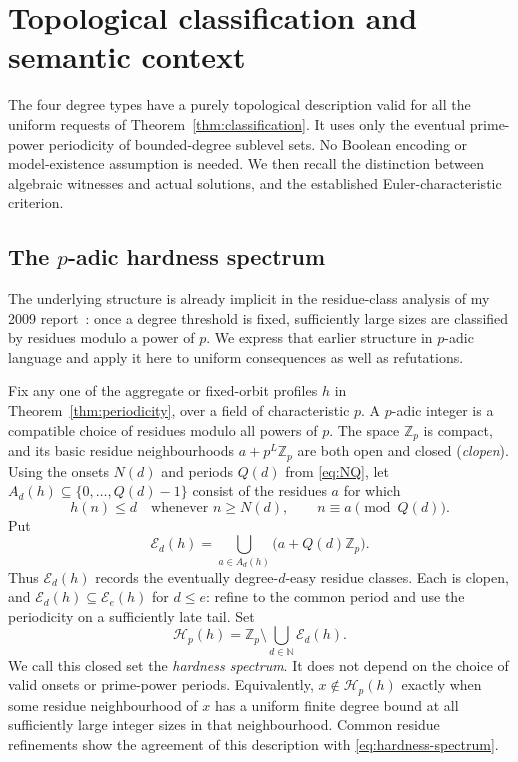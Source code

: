 \section{Topological classification and semantic context}
\label{sec:model-theory}
The four degree types have a purely topological description valid for
all the uniform requests of Theorem~\ref{thm:classification}. It uses
only the eventual prime-power periodicity of bounded-degree
sublevel sets. No Boolean encoding or model-existence assumption is
needed. We then recall the distinction between algebraic witnesses
and actual solutions, and the established Euler-characteristic criterion.

\subsection{The \texorpdfstring{$p$}{p}-adic hardness spectrum}
\label{sec:topological-spectrum}
The underlying structure is already implicit in the residue-class
analysis of my 2009 report~\cite[Section~4, pp.~18--19]{RiisLong}:
once a degree threshold is fixed, sufficiently large sizes are classified
by residues modulo a power of $p$. We express that earlier structure
in $p$-adic language and apply it here to uniform consequences as well
as refutations.

Fix any one of the aggregate or fixed-orbit profiles $h$ in
Theorem~\ref{thm:periodicity}, over a field of characteristic $p$.
A $p$-adic integer is a compatible choice of residues modulo all powers
of $p$. The space $\mathbb Z_p$ is compact, and its basic residue
neighbourhoods $a+p^L\mathbb Z_p$ are both open and closed
(\emph{clopen}). Using the onsets $N(d)$ and periods $Q(d)$ from
\eqref{eq:NQ}, let $A_d(h)\subseteq\{0,\ldots,Q(d)-1\}$ consist of
the residues $a$ for which
\[
 h(n)\le d\quad\text{whenever }n\ge N(d),\qquad
                         n\equiv a\pmod{Q(d)}.
\]
Put
\[
 \mathcal E_d(h)=\bigcup_{a\in A_d(h)}
                         \bigl(a+Q(d)\mathbb Z_p\bigr).
\]
Thus $\mathcal E_d(h)$ records the eventually degree-$d$-easy residue
classes. Each is clopen, and $\mathcal E_d(h)\subseteq\mathcal E_e(h)$
for $d\le e$: refine to the common period and use the periodicity on a
sufficiently late tail. Set
\begin{equation}\label{eq:hardness-spectrum}
 \mathcal H_p(h)=\mathbb Z_p\setminus
                    \bigcup_{d\in\mathbb N}\mathcal E_d(h).
\end{equation}
We call this closed set the \emph{hardness spectrum}. It does not depend
on the choice of valid onsets or prime-power periods. Equivalently,
$x\notin\mathcal H_p(h)$ exactly when some residue neighbourhood of
$x$ has a uniform finite degree bound at all sufficiently large integer
sizes in that neighbourhood. Common residue refinements show the
agreement of this description with \eqref{eq:hardness-spectrum}.

